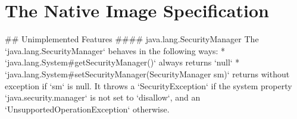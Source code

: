 


\chapter{The Native Image Specification}\label{native_image_specs}


## Unimplemented Features
#### java.lang.SecurityManager
The `java.lang.SecurityManager` behaves in the following ways:
* `java.lang.System#getSecurityManager()` always returns `null`
* `java.lang.System#setSecurityManager(SecurityManager sm)` returns without exception if `sm` is null. 
It throws a `SecurityException` if the system property `java.security.manager` is not set to `disallow`, and an 
`UnsupportedOperationException` otherwise.



